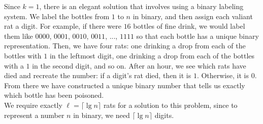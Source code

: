 \documentclass[12pt]{article}
\begin{document}
\begin{enumerate}

    Since $k = 1$, there is an elegant solution that involves using a binary labeling system. We label the bottles from $1$ to $n$ in binary, and then assign each valiant rat a digit. For example, if there were $16$ bottles of fine drink, we would label them like $0000$, $0001$, $0010$, $0011$, ..., $1111$ so that each bottle has a unique binary representation. Then, we have four rats: one drinking a drop from each of the bottles with $1$ in the leftmost digit, one drinking a drop from each of the bottles with a $1$ in the second digit, and so on. After an hour, we see which rats have died and recreate the number: if a digit's rat died, then it is $1$. Otherwise, it is $0$. From there we have constructed a unique binary number that tells us exactly which bottle has been poisoned.\\
    
    We require exactly $\ell = \lceil\lg n\rceil$ rats for a solution to this problem, since to represent a number $n$ in binary, we need $\lceil \lg n \rceil$ digits.

\end{enumerate}
\end{document}
